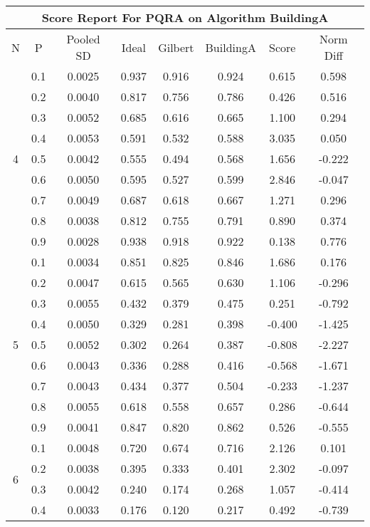 \documentclass[11pt,a4paper]{report}
\begin{document}
\begin{longtable}{ | c | c || c | c | c | c | c | c | }
\hline
\multicolumn{8}{|c|}{ Score Report For PQRA on Algorithm BuildingA} \\
\hline
N & P & Pooled SD &  Ideal &  Gilbert & BuildingA  & Score & Norm Diff \\
 \hline
 \hline
 \endhead
\multirow{9}{*}{4} & 0.1 & 0.0025 & 0.937 & 0.916 & 0.924 & 0.615 & 0.598 \\
 & 0.2 & 0.0040 & 0.817 & 0.756 & 0.786 & 0.426 & 0.516 \\
 & 0.3 & 0.0052 & 0.685 & 0.616 & 0.665 & 1.100 & 0.294 \\
 & 0.4 & 0.0053 & 0.591 & 0.532 & 0.588 & 3.035 & 0.050 \\
 & 0.5 & 0.0042 & 0.555 & 0.494 & 0.568 & 1.656 & -0.222 \\
 & 0.6 & 0.0050 & 0.595 & 0.527 & 0.599 & 2.846 & -0.047 \\
 & 0.7 & 0.0049 & 0.687 & 0.618 & 0.667 & 1.271 & 0.296 \\
 & 0.8 & 0.0038 & 0.812 & 0.755 & 0.791 & 0.890 & 0.374 \\
 & 0.9 & 0.0028 & 0.938 & 0.918 & 0.922 & 0.138 & 0.776 \\
 \hline
\multirow{9}{*}{5} & 0.1 & 0.0034 & 0.851 & 0.825 & 0.846 & 1.686 & 0.176 \\
 & 0.2 & 0.0047 & 0.615 & 0.565 & 0.630 & 1.106 & -0.296 \\
 & 0.3 & 0.0055 & 0.432 & 0.379 & 0.475 & 0.251 & -0.792 \\
 & 0.4 & 0.0050 & 0.329 & 0.281 & 0.398 & -0.400 & -1.425 \\
 & 0.5 & 0.0052 & 0.302 & 0.264 & 0.387 & -0.808 & -2.227 \\
 & 0.6 & 0.0043 & 0.336 & 0.288 & 0.416 & -0.568 & -1.671 \\
 & 0.7 & 0.0043 & 0.434 & 0.377 & 0.504 & -0.233 & -1.237 \\
 & 0.8 & 0.0055 & 0.618 & 0.558 & 0.657 & 0.286 & -0.644 \\
 & 0.9 & 0.0041 & 0.847 & 0.820 & 0.862 & 0.526 & -0.555 \\
 \hline
\multirow{9}{*}{6} & 0.1 & 0.0048 & 0.720 & 0.674 & 0.716 & 2.126 & 0.101 \\
 & 0.2 & 0.0038 & 0.395 & 0.333 & 0.401 & 2.302 & -0.097 \\
 & 0.3 & 0.0042 & 0.240 & 0.174 & 0.268 & 1.057 & -0.414 \\
 & 0.4 & 0.0033 & 0.176 & 0.120 & 0.217 & 0.492 & -0.739 \\

\end{longtable}
\end{document}
